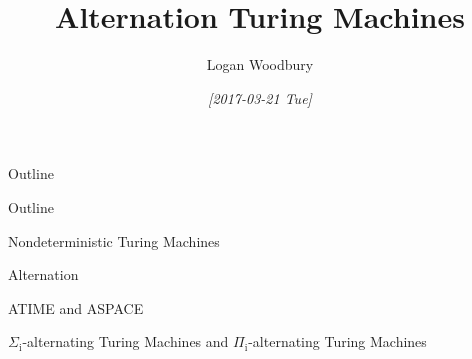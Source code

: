 \documentclass[presentation]{beamer}
\author{Logan Woodbury}
\date{\textit{[2017-03-21 Tue]}}
\title{Alternation Turing Machines}
\begin{document}
\maketitle
\begin{frame}{Outline}
\tableofcontents
\end{frame}

\begin{block}{Outline}
\begin{block}{Nondeterministic Turing Machines}
\end{block}
\begin{block}{Alternation}
\end{block}
\begin{block}{ATIME and ASPACE}
\end{block}
\begin{block}{\(\Sigma_{\text{i}}\)-alternating Turing Machines and \(\Pi_{\text{i}}\)-alternating Turing Machines}
\end{block}
\end{block}
\end{document}
